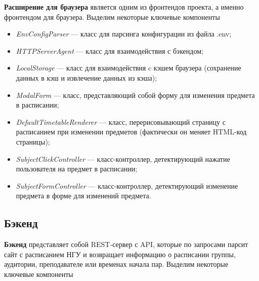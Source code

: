 			\textbf{Расширение для браузера} является одним из фронтендов проекта, а именно фронтендом для браузера. Выделим некоторые ключевые компоненты
			\begin{itemize}
				\item \textit{EnvConfigParser} --- класс для парсинга конфигурации из файла .env;
			
				\item \textit{HTTPServerAgent} --- класс для взаимодействия с бэкендом;
				
				\item \textit{LocalStorage} --- класс для взаимодействия c кэшем браузера (сохранение данных в кэш и извлечение данных из кэша);
			
				\item \textit{ModalForm} --- класс, представляющий собой форму для изменения предмета в расписании;
				
				\item \textit{DefaultTimetableRenderer} --- класс, перерисовывающий страницу с расписанием при изменении предметов (фактически он меняет HTML-код страницы);
				
				\item \textit{SubjectClickController} --- класс-контроллер, детектирующий нажатие пользователя на предмет в расписании;
				
				\item \textit{SubjectFormController} --- класс-контроллер, детектирующий изменение предмета в форме для изменений предмета.
			\end{itemize}
		\subsection{Бэкенд}	
			\begin{figure}[h!]
				\centering
				\def\svgwidth{\columnwidth}
				
			\end{figure}
			
			\textbf{Бэкенд} представляет собой REST-сервер с API, которые по запросами парсит сайт с расписанием НГУ и возвращает информацию о расписании группы, аудитории, преподавателе или временах начала пар. Выделим некоторые ключевые компоненты
			
